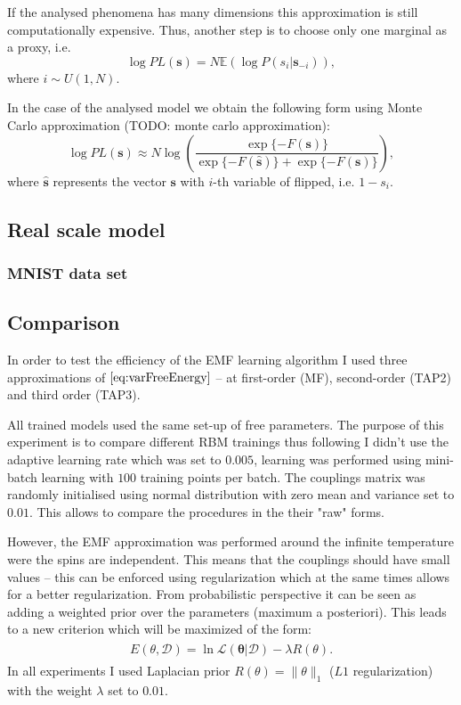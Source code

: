 \documentclass[../report/report.tex]{subfiles}
\begin{document}
If the analysed phenomena has many dimensions this approximation is still computationally expensive. Thus, another step is to choose only one marginal as a proxy, i.e.
\begin{equation}
\log PL(\mathbf{s}) = N \mathbb{E}\left(\log P(s_i | \mathbf{s}_{-i}) \right),
\end{equation}
where $i \sim U(1, N)$.

In the case of the analysed model we obtain the following form using Monte Carlo approximation (TODO: monte carlo approximation):
\begin{equation}
\log PL(\mathbf{s}) \approx N \log \left( \frac{\exp\{- F(\mathbf{s})\}}{\exp\{-F(\mathbf{\hat{s}})\} + \exp\{- F(\mathbf{s})\}} \right),
\end{equation}
where $\mathbf{\hat{s}}$ represents the vector $\mathbf{s}$ with $i$-th variable of flipped, i.e. $1-s_i$.

\subsection{Real scale model}
\subsubsection{MNIST data set}
\subsection{Comparison}


In order to test the efficiency of the EMF learning algorithm I used three approximations of $\ref{eq:varFreeEnergy}$ -- at first-order (MF), second-order (TAP2) and third order (TAP3). 


All trained models used the same set-up of free parameters. The purpose of this experiment is to compare different RBM trainings thus following \cite{gabrie2015training} I didn't use the adaptive learning rate which was set to $0.005$, learning was performed using mini-batch learning with $100$ training points per batch. The couplings matrix was randomly initialised using normal distribution with zero mean and variance set to $0.01$. This allows to compare the procedures in the their "raw" forms. 

However, the EMF approximation was performed around the infinite temperature were the spins are independent. This means that the couplings should have small values -- this can be enforced using regularization which at the same times allows for a better regularization. From probabilistic perspective it can be seen as adding a weighted prior over the parameters (maximum a posteriori). This leads to a new criterion which will be maximized of the form:
\begin{align}
\begin{split}
E(\theta, \mathcal{D}) = \ln \mathcal{L}(\mathbf{\theta}| \mathcal{D}) - \lambda R(\theta).
\end{split}
\end{align}
In all experiments I used Laplacian prior $R(\theta) = \| \theta \|_1$ ($L1$ regularization) with the weight $\lambda$ set to $0.01$. 
\end{document}
